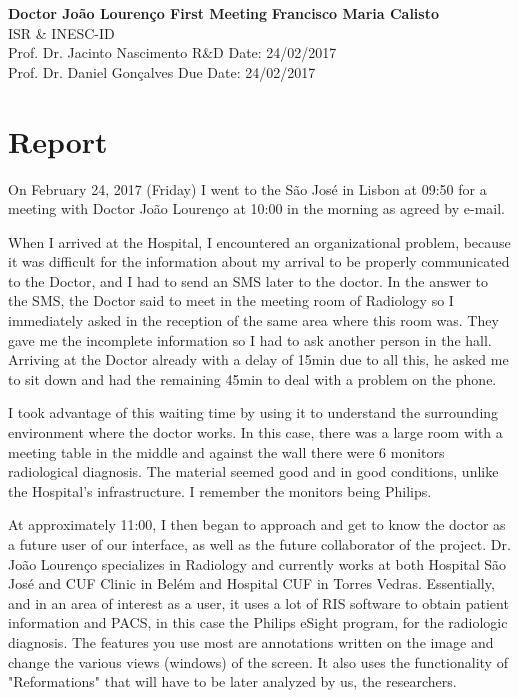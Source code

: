 \documentclass[a4paper, 11pt]{article}
\begin{document}
\noindent
\large\textbf{Doctor Jo\~{a}o Louren\c{c}o First Meeting} \hfill \textbf{Francisco Maria Calisto} \\
\normalsize ISR \& INESC-ID \\
Prof. Dr. Jacinto Nascimento \hfill R\&D Date: 24/02/2017 \\
Prof. Dr. Daniel Gon\c{c}alves \hfill Due Date: 24/02/2017

\section*{Report}

On February 24, 2017 (Friday) I went to the S\~{a}o Jos\'{e} in Lisbon at 09:50 for a meeting with Doctor Jo\~{a}o Louren\c{c}o at 10:00 in the morning as agreed by e-mail.

When I arrived at the Hospital, I encountered an organizational problem, because it was difficult for the information about my arrival to be properly communicated to the Doctor, and I had to send an SMS later to the doctor. In the answer to the SMS, the Doctor said to meet in the meeting room of Radiology so I immediately asked in the reception of the same area where this room was. They gave me the incomplete information so I had to ask another person in the hall. Arriving at the Doctor already with a delay of 15min due to all this, he asked me to sit down and had the remaining 45min to deal with a problem on the phone.

I took advantage of this waiting time by using it to understand the surrounding environment where the doctor works. In this case, there was a large room with a meeting table in the middle and against the wall there were 6 monitors radiological diagnosis. The material seemed good and in good conditions, unlike the Hospital's infrastructure. I remember the monitors being Philips.

At approximately 11:00, I then began to approach and get to know the doctor as a future user of our interface, as well as the future collaborator of the project. Dr. Jo\~{a}o Louren\c{c}o \cite{joaoLourenco} specializes in Radiology and currently works at both Hospital S\~{a}o Jos\'{e} and CUF Clinic in Bel\'{e}m and Hospital CUF in Torres Vedras. Essentially, and in an area of ​​interest as a user, it uses a lot of RIS software to obtain patient information and PACS, in this case the Philips eSight program, for the radiologic diagnosis. The features you use most are annotations written on the image and change the various views (windows) of the screen. It also uses the functionality of "Reformations" that will have to be later analyzed by us, the researchers.
\end{document}
